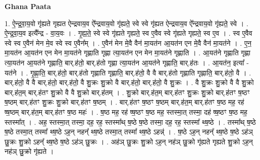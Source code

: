 \documentclass[17pt]{extarticle}
\begin{document}
\textbf{Ghana Paata } \newline

1. ऐ॒न्द्र॒वा॒य॒वो गृ॑ह्यते गृह्यत ऐन्द्रवाय॒व ऐ᳚न्द्रवाय॒वो गृ॑ह्यते॒ स्वे स्वे गृ॑ह्यत ऐन्द्रवाय॒व ऐ᳚न्द्रवाय॒वो गृ॑ह्यते॒ स्वे । . ऐ॒न्द्र॒वा॒य॒व इत्यै᳚न्द्र - वा॒य॒वः । . गृ॒ह्य॒ते॒ स्वे स्वे गृ॑ह्यते गृह्यते॒ स्व ए॒वैव स्वे गृ॑ह्यते गृह्यते॒ स्व ए॒व । . स्व ए॒वैव स्वे स्व ए॒वैन॑ मेन मे॒व स्वे स्व ए॒वैन᳚म् । . ए॒वैन॑ मेन मे॒वै वैन॑ मा॒यत॑न आ॒यत॑न एन मे॒वै वैन॑ मा॒यत॑ने । . ए॒न॒ मा॒यत॑न आ॒यत॑न एन मेन मा॒यत॑ने गृह्णाति गृह्णा त्या॒यत॑न एन मेन मा॒यत॑ने गृह्णाति । . आ॒यत॑ने गृह्णाति गृह्णा त्या॒यत॑न आ॒यत॑ने गृह्णाति॒ बार्.ह॑तो॒ बार्.ह॑तो गृह्णा त्या॒यत॑न आ॒यत॑ने गृह्णाति॒ बार्.ह॑तः । . आ॒यत॑न॒ इत्या᳚ - यत॑ने । . गृ॒ह्णा॒ति॒ बार्.ह॑तो॒ बार्.ह॑तो गृह्णाति गृह्णाति॒ बार्.ह॑तो॒ वै वै बार्.ह॑तो गृह्णाति गृह्णाति॒ बार्.ह॑तो॒ वै । . बार्.ह॑तो॒ वै वै बार्.ह॑तो॒ बार्.ह॑तो॒ वै शु॒क्रः शु॒क्रो वै बार्.ह॑तो॒ बार्.ह॑तो॒ वै शु॒क्रः । . वै शु॒क्रः शु॒क्रो वै वै शु॒क्रो बार्.ह॑त॒म् बार्.ह॑तꣳ शु॒क्रो वै वै शु॒क्रो बार्.ह॑तम् । . शु॒क्रो बार्.ह॑त॒म् बार्.ह॑तꣳ शु॒क्रः शु॒क्रो बार्.ह॑तꣳ ष॒ष्ठꣳ ष॒ष्ठम् बार्.ह॑तꣳ शु॒क्रः शु॒क्रो बार्.ह॑तꣳ ष॒ष्ठम् । . बार्.ह॑तꣳ ष॒ष्ठꣳ ष॒ष्ठम् बार्.ह॑त॒म् बार्.ह॑तꣳ ष॒ष्ठ मह॒ रह॑ ष्ष॒ष्ठम् बार्.ह॑त॒म् बार्.ह॑तꣳ ष॒ष्ठ महः॑ । . ष॒ष्ठ मह॒ रह॑ ष्ष॒ष्ठꣳ ष॒ष्ठ मह॒ स्तस्मा॒त् तस्मा॒ दह॑ ष्ष॒ष्ठꣳ ष॒ष्ठ मह॒ स्तस्मा᳚त् । . अह॒ स्तस्मा॒त् तस्मा॒ दह॒ रह॒ स्तस्मा᳚थ् ष॒ष्ठे ष॒ष्ठे तस्मा॒ दह॒ रह॒ स्तस्मा᳚ थ्ष॒ष्ठे । . तस्मा᳚थ् ष॒ष्ठे ष॒ष्ठे तस्मा॒त् तस्मा᳚ थ्ष॒ष्ठे ऽह॒न् नहन्᳚ थ्ष॒ष्ठे तस्मा॒त् तस्मा᳚ थ्ष॒ष्ठे ऽहन्न्॑ । . ष॒ष्ठे ऽह॒न् नहन्᳚ थ्ष॒ष्ठे ष॒ष्ठे ऽह॑ञ् छु॒क्रः शु॒क्रो ऽहन्᳚ थ्ष॒ष्ठे ष॒ष्ठे ऽह॑ञ् छु॒क्रः । . अह॑ञ् छु॒क्रः शु॒क्रो ऽह॒न् नह॑ञ् छु॒क्रो गृ॑ह्यते गृह्यते शु॒क्रो ऽह॒न् नह॑ञ् छु॒क्रो गृ॑ह्यते । \newline
\end{document}
